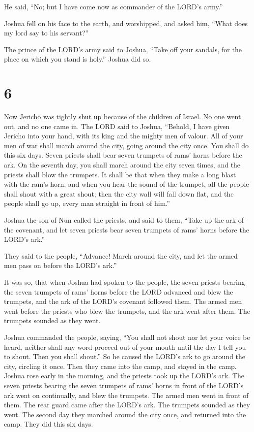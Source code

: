  He said, ``No; but I have come now as commander of the
LORD's army.''

Joshua fell on his face to the earth, and worshipped, and asked him,
``What does my lord say to his servant?''

 The prince of the LORD's army said to Joshua, ``Take off
your sandals, for the place on which you stand is holy.'' Joshua did so.

\hypertarget{section-5}{%
\section{6}\label{section-5}}

 Now Jericho was tightly shut up because of the children of
Israel. No one went out, and no one came in.  The LORD said
to Joshua, ``Behold, I have given Jericho into your hand, with its king
and the mighty men of valour.  All of your men of war shall
march around the city, going around the city once. You shall do this six
days.  Seven priests shall bear seven trumpets of rams'
horns before the ark. On the seventh day, you shall march around the
city seven times, and the priests shall blow the trumpets. 
It shall be that when they make a long blast with the ram's horn, and
when you hear the sound of the trumpet, all the people shall shout with
a great shout; then the city wall will fall down flat, and the people
shall go up, every man straight in front of him.''

 Joshua the son of Nun called the priests, and said to them,
``Take up the ark of the covenant, and let seven priests bear seven
trumpets of rams' horns before the LORD's ark.''

 They said to the people, ``Advance! March around the city,
and let the armed men pass on before the LORD's ark.''

 It was so, that when Joshua had spoken to the people, the
seven priests bearing the seven trumpets of rams' horns before the LORD
advanced and blew the trumpets, and the ark of the LORD's covenant
followed them.  The armed men went before the priests who
blew the trumpets, and the ark went after them. The trumpets sounded as
they went.

 Joshua commanded the people, saying, ``You shall not shout
nor let your voice be heard, neither shall any word proceed out of your
mouth until the day I tell you to shout. Then you shall shout.''
 So he caused the LORD's ark to go around the city,
circling it once. Then they came into the camp, and stayed in the camp.
 Joshua rose early in the morning, and the priests took up
the LORD's ark.  The seven priests bearing the seven
trumpets of rams' horns in front of the LORD's ark went on continually,
and blew the trumpets. The armed men went in front of them. The rear
guard came after the LORD's ark. The trumpets sounded as they went.
 The second day they marched around the city once, and
returned into the camp. They did this six days.

